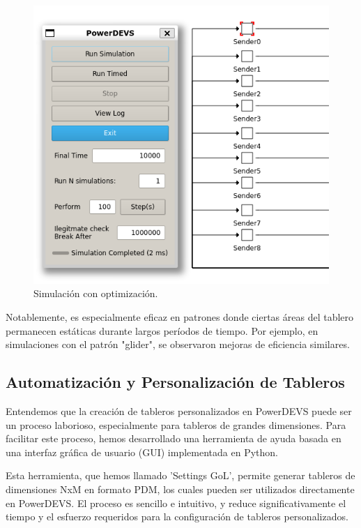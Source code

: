 \documentclass[]{article}
\begin{document}
\begin{figure}[ht]
\begin{minipage}[b]{0.455\linewidth}
    \includegraphics[width=\textwidth]{../assets/pdevs/2ms.png}
    \caption{Simulación con optimización.}
    \label{fig:optimization}
  \end{minipage}
\end{figure}

Notablemente, es especialmente eficaz en patrones donde ciertas áreas del tablero permanecen estáticas durante largos períodos de tiempo. Por ejemplo, en simulaciones con el patrón "glider", se observaron mejoras de eficiencia similares.



\subsection{Automatización y Personalización de Tableros}

Entendemos que la creación de tableros personalizados en PowerDEVS puede ser un proceso laborioso, especialmente para tableros de grandes dimensiones. Para facilitar este proceso, hemos desarrollado una herramienta de ayuda basada en una interfaz gráfica de usuario (GUI) implementada en Python.

Esta herramienta, que hemos llamado 'Settings GoL', permite generar tableros de dimensiones NxM en formato PDM, los cuales pueden ser utilizados directamente en PowerDEVS. El proceso es sencillo e intuitivo, y reduce significativamente el tiempo y el esfuerzo requeridos para la configuración de tableros personalizados.
\end{document}
